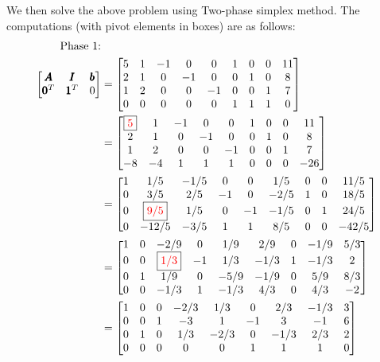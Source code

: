 \documentclass[a4paper,11pt]{article}
\newcommand{\V}[1]{\pmb{#1}}
\begin{document}
\noindent We then solve the above problem using Two-phase simplex method. The computations (with pivot elements in boxes) are as follows:
\begin{align}
\text{Phase 1:}&\nonumber\\
%
\begin{bmatrix}
 \V{A}& \V{I}& \V{b}\\
 \V{0}^T& \V{1}^T& 0
\end{bmatrix}
% 
&=\begin{bmatrix}
5&	1&	-1&	0&	0&	1&	0&	0&	11\\
2&	1&	0&	-1&	0&	0&	1&	0&	8\\
1&	2&	0&	0&	-1&	0&	0&	1&	7\\
0&	0&	0&	0&	0&	1&	1&	1&	0
\end{bmatrix}\nonumber\\
% 
&=\begin{bmatrix}
\fbox{{\color{red}5}}&	1&	-1&	0&	0&	1&	0&	0&	11\\
2&	1&	0&	-1&	0&	0&	1&	0&	8\\
1&	2&	0&	0&	-1&	0&	0&	1&	7\\
-8&	-4&	1&	1&	1&	0&	0&	0&	-26
\end{bmatrix}\nonumber\\
% 
&=\begin{bmatrix}
1&	1/5&	-1/5&	0&	0&	1/5&	0&	0&	11/5\\
0&	3/5&	2/5&	-1&	0&	-2/5&	1&	0&	18/5\\
0&	\fbox{{\color{red}9/5}}&	1/5&	0&	-1&	-1/5&	0&	1&	24/5\\
0&	-12/5&	-3/5&	1&	1&	8/5&	0&	0&	-42/5
\end{bmatrix}\nonumber\\
% 
&=\begin{bmatrix}
1&	0&	-2/9&	0&	1/9&	2/9&	0&	-1/9&	5/3\\
0&	0&	\fbox{{\color{red}1/3}}&	-1&	1/3&	-1/3&	1&	-1/3&	2\\
0&	1&	1/9&	0&	-5/9&	-1/9&	0&	5/9&	8/3\\
0&	0&	-1/3&	1&	-1/3&	4/3&	0&	4/3&	-2
\end{bmatrix}\nonumber\\
% 
&=\begin{bmatrix}
1&	0&	0&	-2/3&	1/3&	0&	2/3&	-1/3&	3\\
0&	0&	1&	-3&	1&	-1&	3&	-1&	6\\
0&	1&	0&	1/3&	-2/3&	0&	-1/3&	2/3&	2\\
0&	0&	0&	0&	0&	1&	1&	1&	0
\end{bmatrix}\nonumber
\end{align}
\end{document}
